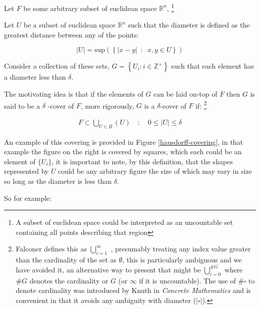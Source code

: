 \documentclass[a4paper,11pt,twoside]{article}
\begin{document}
Let \(F\) be some arbitrary subset of euclidean space \(\mathbb{R}^n\), \footnote{A subset of euclidean space could be interpreted as an uncountable set containing all points describing that region}

Let \(U\) be a subset of euclidean space \(\mathbb{R}^{n}\) such that the diameter is defined as the greatest distance between any of the points:

\[
\left\lvert U \right\rvert = \mathrm{sup}\left(\left\{ \left\lvert x- y \right\rvert \enspace : \enspace x,y \in U\right\}  \right)
\]

Consider a collection of these sets, \(G = \left\{U_i: i \in \mathbb{Z}^{+}\right\}\) such that each element has a diameter less than \(\delta\).


The motivating idea is that if the elements of \(G\) can be laid on-top of
\(F\) then \(G\) is said to be a \(\delta\) -cover of \(F\), more rigorously, \(G\) is a \(\delta\)-cover of \(F\) if: \footnote{Falconer defines this as \(\bigcup_{i=1}^{\infty}\) \cite[\S 2.1]{falconerFractalGeometryMathematical2003b},
presumably treating any index value greater than the cardinality of the set as \(\emptyset\), this is particularly ambiguous and we have avoided it, an alternative way to present that might be \(\bigcup^{\#G}_{i=0}\) where \(\#G\) denotes the cardinality or \(G\) (or \(\infty\) if it is uncountable). The use of \(\#\square\) to denote cardinality was introduced by Knuth in \emph{Concrete Mathematics} \cite{grahamConcreteMathematicsFoundation1994} and is convenient in that it avoids any ambiguity  with diameter (\(\left\lvert \square \right\rvert\)).}

\begin{align}
    F \subset \bigcup_{U\in B} \left( U \right) \quad :\quad 0 \leq \left\lvert U \right\rvert \leq \delta \label{eq:hausdorff-covering}
\end{align}



An example of this covering is provided in Figure \ref{hausdorff-covering}, in that example the figure on the right is covered by squares, which each could be an element of \(\{U_{i}\}\), it is important to note, by this definition, that the shapes represented by \(U\) could be any arbitrary figure \cite[\S 2.1]{falconerFractalGeometryMathematical2003b} the size of which may vary in size so long as the diameter is less than \(\delta\).


So for example:
\end{document}
